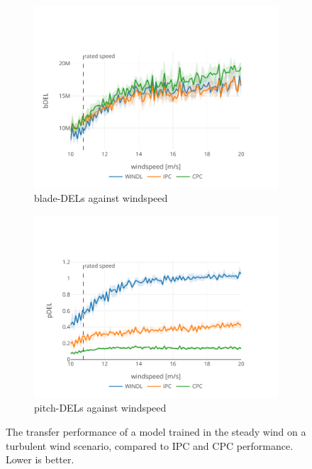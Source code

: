 \begin{figure}
  \centering
  \begin{subfigure}[b]{0.48\textwidth}
      \centering
      \includegraphics[width=\textwidth]{images/transfer_turbulent_bdel.pdf}
      \caption{blade-DELs against windspeed}
      \label{fig:transfer-turbulent-bdel}
  \end{subfigure}
  \begin{subfigure}[b]{0.48\textwidth}
      \centering
      \includegraphics[width=\textwidth]{images/transfer_turbulent_pdel.pdf}
      \caption{pitch-DELs against windspeed}
      \label{fig:transfer-turbulent-pdel}
  \end{subfigure}
  \caption{The transfer performance of a model trained in the steady wind on a turbulent wind scenario, compared to IPC and CPC performance. Lower is better.}
  \label{fig:transfer-turbulent}
\end{figure}

